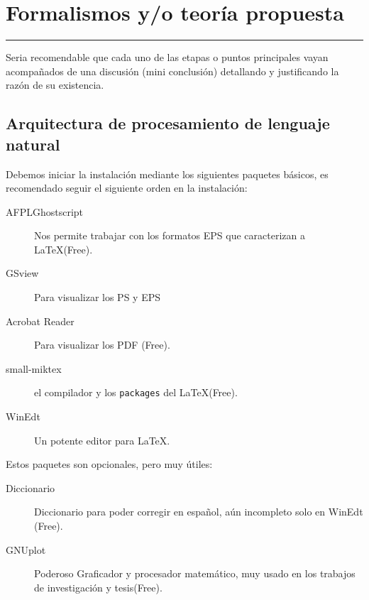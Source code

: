\chapter{Formalismos y/o teoría propuesta}
\hrule \bigskip \vspace*{1cm}

Seria recomendable que cada uno de las etapas o puntos principales
vayan acompañados de una discusión (mini conclusión) detallando y
justificando la razón de su existencia.

\section{Arquitectura de procesamiento de lenguaje natural}

Debemos iniciar la instalación mediante los siguientes paquetes
básicos, es recomendado seguir el siguiente orden en la
instalación:

\begin{description}
    \item[AFPLGhostscript] Nos permite trabajar con los formatos
    EPS que caracterizan a \LaTeX (Free).
    \item[GSview] Para visualizar los PS y EPS
    \item[Acrobat Reader] Para visualizar los PDF (Free).
    \item[small-miktex] el compilador y los \verb"packages" del
    \LaTeX (Free).
    \item[WinEdt] Un potente editor para \LaTeX.
\end{description}

Estos paquetes son opcionales, pero muy útiles:

\begin{description}
        \item[Diccionario] Diccionario para poder corregir en
    español, aún incompleto solo en WinEdt (Free).
     \item[GNUplot]Poderoso Graficador y procesador matemático, muy usado
     en los trabajos de investigación y tesis(Free).
\end{description}
